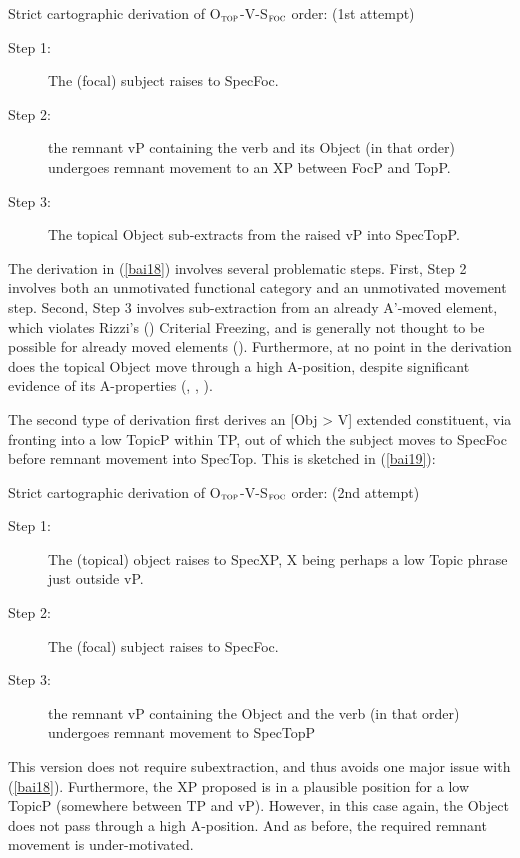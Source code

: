 \documentclass[output=paper]{langscibook}
\begin{document}
\begin{exe}
\ex \label{bai18}
Strict cartographic derivation of O$_{\textsc{top}}$-V-S$_{\textsc{foc}}$ order: (1st attempt)
\begin{description}
\item[Step 1:]  The (focal) subject raises to SpecFoc.
\item[Step 2:]  the remnant vP containing the verb and its Object (in that order) undergoes remnant movement to an XP between FocP and TopP. 
\item[Step 3:]  The topical Object sub-extracts from the raised vP into SpecTopP.
\end{description}
\end{exe}

The derivation in (\ref{bai18}) involves several problematic steps. First, Step 2 involves both an unmotivated functional category and an unmotivated movement step. Second, Step 3 involves sub-extraction from an already A’-moved element, which violates Rizzi's (\citeyear{Rizzi2004}) Criterial Freezing, and is generally not thought to be possible for already moved elements (\citealt{Stepanov2007}). Furthermore, at no point in the derivation does the topical Object move through a high A-position, despite significant evidence of its A-properties (\citealt{Bailyn2004}, \citealt{Antonyuk2021}, \citealt{Pereltsvaig2021}).

The second type of derivation first derives an [Obj > V] extended constituent, via fronting into a low TopicP within TP, out of which the subject moves to SpecFoc before remnant movement into SpecTop.  This is sketched in (\ref{bai19}): 

\begin{exe}
\ex \label{bai19}
Strict cartographic derivation of O$_{\textsc{top}}$-V-S$_{\textsc{foc}}$ order: (2nd attempt)
\begin{description}
\item[Step 1:]  The (topical) object raises to SpecXP, X being perhaps a low Topic phrase just outside vP.
\item[Step 2:]  The (focal) subject raises to SpecFoc.
\item[Step 3:]  the remnant vP containing the Object and the verb (in that order) undergoes remnant movement to SpecTopP
\end{description}
\end{exe}

This version does not require subextraction, and thus avoids one major issue with (\ref{bai18}). Furthermore, the XP proposed is in a plausible position for a low TopicP (somewhere between TP and vP). However, in this case again, the Object does not pass through a high A-position. And as before, the required remnant movement is under-motivated. 
\end{document}
